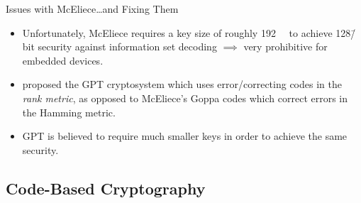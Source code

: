 \documentclass[usepdftitle=false]{beamer}
\begin{document}
\begin{frame}{Issues with McEliece}{\ldots{}and Fixing Them}
  \begin{itemize}
  \item Unfortunately, McEliece requires a key size of roughly
    \SI{192}{\kilo\byte} to achieve \num{128}\=/bit security against
    information set decoding \(\implies\) very prohibitive for
    embedded devices.
  \item \Textcite{GPT91} proposed the GPT cryptosystem which uses
    error\-/correcting codes in the \emph{rank metric}, as opposed to
    McEliece's Goppa codes which correct errors in the Hamming metric.
  \item GPT is believed to require much smaller keys in order to
    achieve the same security.
  \end{itemize}
\end{frame}

\subsection{Code-Based Cryptography}
\end{document}
